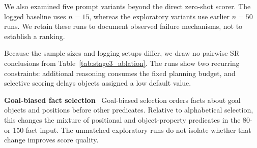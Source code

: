 \documentclass{ieeeaccess}
\newcommand{\tref}[1]{Table~\ref{#1}}
\newcommand{\myparagraph}[1]{\noindent\textbf{#1}~}
\begin{document}
We also examined five prompt variants beyond the direct zero-shot scorer.
The logged baseline uses $n{=}15$, whereas the exploratory variants use earlier $n{=}50$ runs. We retain these runs to document observed failure mechanisms, not to establish a ranking.

\begin{table}[t]
    \centering
    \caption{Exploratory Stage~3 prompt variants on $12{\times}12$ Hard. Direct (alphabetical-80) is the logged baseline ($n{=}15$); rows marked $^\ddagger$ are earlier measurements ($n{=}50$) and are not directly comparable with the baseline.}
    \label{tab:stage3_ablation}
\end{table}

Because the sample sizes and logging setups differ, we draw no pairwise SR conclusions from \tref{tab:stage3_ablation}. The runs show two recurring constraints: additional reasoning consumes the fixed planning budget, and selective scoring delays objects assigned a low default value.

\myparagraph{Goal-biased fact selection}
Goal-biased selection orders facts about goal objects and positions before other predicates. Relative to alphabetical selection, this changes the mixture of positional and object-property predicates in the 80- or 150-fact input. The unmatched exploratory runs do not isolate whether that change improves score quality.
\end{document}

